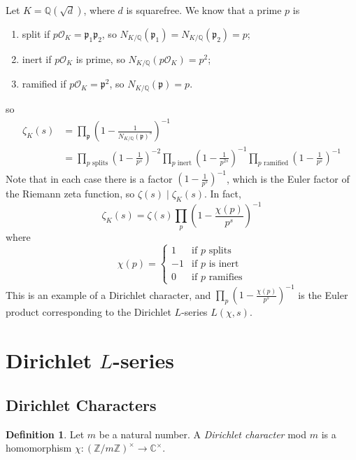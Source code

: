\documentclass[11pt]{article}
\theoremstyle{definition}
\newtheorem{definition}{Definition}[section]
\theoremstyle{plain}
\theoremstyle{remark}
\newcommand{\ZZ}{\mathbb{Z}}
\newcommand{\QQ}{\mathbb{Q}}
\newcommand{\CC}{\mathbb{C}}
\newcommand{\cO}{\mathcal{O}}
\newcommand{\fp}{\mathfrak{p}}
\begin{document}
\noindent Let $K = \QQ(\sqrt{d})$, where $d$ is squarefree. We know that a prime $p$ is
\begin{enumerate}
    \item split if $p \cO_K = \fp_1 \fp_2$, so $N_{K/\QQ}(\fp_1) = N_{K/\QQ}(\fp_2) = p$;
    \item inert if $p \cO_K$ is prime, so $N_{K/\QQ} (p \cO_K) = p^2$;
    \item ramified if $p \cO_K = \fp^2$, so $N_{K/\QQ}(\fp) = p$.
\end{enumerate}
so
\begin{align*}
    \zeta_K(s)
    &= \prod_{\fp} \left(1 - \frac{1}{N_{K/\QQ}(\fp)^s}\right)^{-1}\\
    &= \prod_{p \text{ splits}} \left(1 - \frac{1}{p^s}\right)^{-2} \prod_{p \text{ inert}} \left(1 - \frac{1}{p^{2s}}\right)^{-1} \prod_{p \text{ ramified}} \left(1 - \frac{1}{p^s}\right)^{-1}
\end{align*}
Note that in each case there is a factor $\left(1-\frac{1}{p^s}\right)^{-1}$, which is the Euler factor of the Riemann zeta function, so $\zeta(s) \mid \zeta_K(s)$. In fact,
\begin{equation*}
    \zeta_K(s) = \zeta(s) \prod_p \left(1 - \frac{\chi(p)}{p^s}\right)^{-1}
\end{equation*}
where
\begin{equation*}
    \chi(p) = \begin{cases}
        1 & \text{if } p \text{ splits}\\
        -1 & \text{if } p \text{ is inert}\\
        0 & \text{if } p \text{ ramifies}
    \end{cases}
\end{equation*}
This is an example of a Dirichlet character, and $\prod_p \left(1 - \frac{\chi(p)}{p^s}\right)^{-1}$ is the Euler product corresponding to the Dirichlet $L$-series $L(\chi, s)$.

\section{Dirichlet \texorpdfstring{$L$}{L}-series}

\subsection{Dirichlet Characters}

\begin{definition}\label{def:7_1}
    Let $m$ be a natural number. A \emph{Dirichlet character} mod $m$ is a homomorphism $\chi : (\ZZ/m\ZZ)^\times \to \CC^\times$.
\end{definition}
\end{document}
